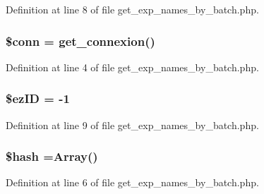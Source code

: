 Definition at line 8 of file get\-\_\-exp\-\_\-names\-\_\-by\-\_\-batch.\-php.

\hypertarget{get__exp__names__by__batch_8php_aa8a5a87b9c1a6a0819b88447cbe41877}{
\subsubsection[{\$conn}]{\setlength{\rightskip}{0pt plus 5cm}\$conn = {\bf get\-\_\-connexion}()}}\label{get__exp__names__by__batch_8php_aa8a5a87b9c1a6a0819b88447cbe41877}


Definition at line 4 of file get\-\_\-exp\-\_\-names\-\_\-by\-\_\-batch.\-php.

\hypertarget{get__exp__names__by__batch_8php_addb1ec3ba55e413a08cb006ce21974df}{
\subsubsection[{\$ez\-I\-D}]{\setlength{\rightskip}{0pt plus 5cm}\${\bf ez\-I\-D} = -\/1}}\label{get__exp__names__by__batch_8php_addb1ec3ba55e413a08cb006ce21974df}


Definition at line 9 of file get\-\_\-exp\-\_\-names\-\_\-by\-\_\-batch.\-php.

\hypertarget{get__exp__names__by__batch_8php_ac9fdf6f2c8fb45c1d3bb9a176802b2ad}{
\subsubsection[{\$hash}]{\setlength{\rightskip}{0pt plus 5cm}\$hash =Array()}}\label{get__exp__names__by__batch_8php_ac9fdf6f2c8fb45c1d3bb9a176802b2ad}


Definition at line 6 of file get\-\_\-exp\-\_\-names\-\_\-by\-\_\-batch.\-php.

